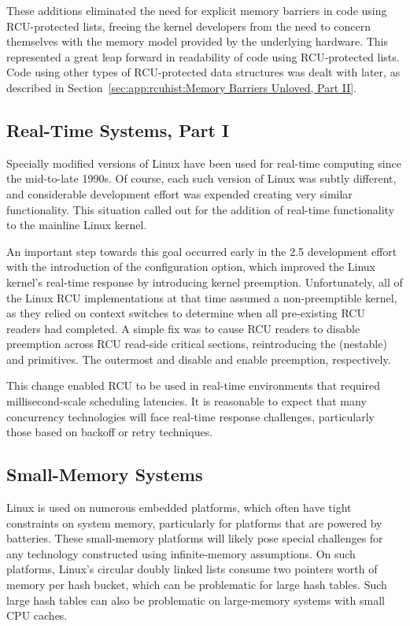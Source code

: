 These additions eliminated the need for explicit memory barriers in code
using RCU-protected lists, freeing the kernel developers from the need
to concern themselves with the memory model provided by
the underlying hardware.
This represented a great leap forward in readability of code using
RCU-protected lists.
Code using other types of RCU-protected data structures was dealt with
later, as described in Section~\ref{sec:app:rcuhist:Memory Barriers Unloved, Part II}.

\subsection{Real-Time Systems, Part I}
\label{sec:app:rcuhist:Real-Time Systems, Part I}

Specially modified versions of Linux have been used for real-time computing
since the mid-to-late 1990s.
Of course, each such version of Linux was subtly different, and
considerable development effort was expended creating
very similar functionality.
This situation called out for the addition of real-time functionality
to the mainline Linux kernel.

An important step towards this goal occurred early in the 2.5 development
effort with the introduction of the  configuration
option, which improved the Linux kernel's real-time response by
introducing kernel preemption.
Unfortunately, all of the Linux RCU implementations at that time assumed a
non-preemptible kernel, as they relied on context switches to determine
when all pre-existing RCU readers had completed.
A simple fix was to cause RCU readers to disable preemption across
RCU read-side critical sections, reintroducing the (nestable)
 and  primitives.
The outermost  and 
disable and enable preemption, respectively.

This change enabled RCU to be used in
real-time environments that required millisecond-scale scheduling latencies.
It is reasonable to expect that many concurrency technologies will face
real-time response challenges, particularly those based on
backoff or retry techniques.

\subsection{Small-Memory Systems}
\label{sec:app:rcuhist:Small-Memory Systems}

Linux is used on numerous embedded platforms, which often have
tight constraints on system memory, particularly for platforms
that are powered by batteries.
These small-memory platforms will likely pose special challenges for any
technology constructed using infinite-memory assumptions.
On such platforms, Linux's circular doubly linked lists consume
two pointers worth of memory per hash bucket, which can be problematic
for large hash tables.
Such large hash tables can also be problematic on large-memory systems
with small CPU caches.

